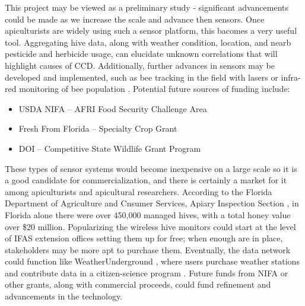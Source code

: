 
This project may be viewed as a preliminary study - significant advancements could be made as we increase the scale and advance then sensors. Once apiculturists are widely using such a sensor platform, this bacomes a very useful tool. Aggregating hive data, along with weather condition, location, and nearb pesticide and herbicide usage, can elucidate unknown correlations that will highlight causes of CCD. Additionally, further advances in sensors may be developed and implemented, such as bee tracking in the field with lasers \cite{carlsten2011field} or infra-red monitoring of bee population \cite{shaw2011long}. Potential future sources of funding include:

\begin{itemize}
\item USDA NIFA -- AFRI Food Security Challenge Area
\item Fresh From Florida -- Specialty Crop Grant
\item DOI -- Competitive State Wildlife Grant Program
\end{itemize}

These types of sensor systems would become inexpensive on a large scale so it is a good candidate for commercialization, and there is certainly a market for it among apiculturists and apicultural researchers. According to the Florida Department of Agriculture and Cnsumer Services, Apiary Inspection Section \cite{fl2015report}, in Florida alone there were over 450,000 managed hives, with a total honey value over \$20 million. Popularizing the wireless hive monitors could start at the level of IFAS extension offices setting them up for free; when enough are in place, stakeholders may be more apt to purchase them. Eventually, the data network could function like WeatherUnderground \cite{weather2016}, where users purchase weather stations and contribute data in a citizen-science program \cite{kremen2011evaluating}. Future funds from NIFA or other grants, along with commercial proceeds, could fund refinement and advancements in the technology.

